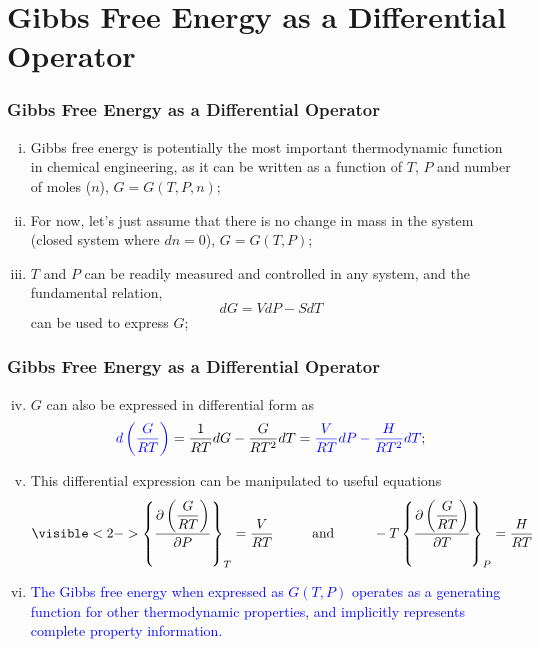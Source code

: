 \documentclass[10pt,compress,unknownkeysallowed]{beamer}
\begin{document}
\section{Gibbs Free Energy as a Differential Operator}

\begin{frame}
  \frametitle{Gibbs Free Energy as a Differential Operator}
     \begin{enumerate}[i)]
        \item<1-> Gibbs free energy is potentially the most important thermodynamic function in chemical engineering, as it can be written as a function of $T$, $P$ and number of moles ($n$), \ie $G=G(T,P,n)$;
        \item<2-> For now, let's just assume that there is no change in mass in the system (\ie closed system where $dn=0$), $G=G(T,P)$;
        \item<3-> $T$ and $P$ can be readily measured and controlled in any system, and the fundamental relation, 
             \begin{displaymath}
                dG = VdP - SdT
              \end{displaymath}
              can be used to express $G$;
     \end{enumerate}

\end{frame}
\normalsize


\begin{frame}
  \frametitle{Gibbs Free Energy as a Differential Operator}
     \begin{enumerate}[i)]\setcounter{enumi}{3}
        \item<1-> $G$ can also be expressed in differential form as 
             \begin{displaymath}
                \textcolor{blue}{d\left(\displaystyle\frac{G}{RT}\right)} = \displaystyle\frac{1}{RT}dG - \displaystyle\frac{G}{RT^{2}}dT = \textcolor{blue}{\displaystyle\frac{V}{RT}dP - \displaystyle\frac{H}{RT^{2}}dT};
              \end{displaymath}
        \item<2-> This differential expression can be  manipulated to useful equations
              \begin{displaymath}
                  \visible<2->{\left\{ \frc{\partial\left(\frc{G}{RT}\right)}{\partial P}\right\}_{T} = \frc{V}{RT}   \hspace{1cm}\text{and}\hspace{1cm} -T\left\{ \frc{\partial\left(\frc{G}{RT}\right)}{\partial T}\right\}_{P} = \frc{H}{RT} }
              \end{displaymath}

        \item<3-> \textcolor{blue}{The Gibbs free energy when expressed as $G\left(T,P\right)$ operates as a generating function for other thermodynamic properties, and implicitly represents complete property information.}
     \end{enumerate}

\end{frame}
\normalsize
\end{document}
